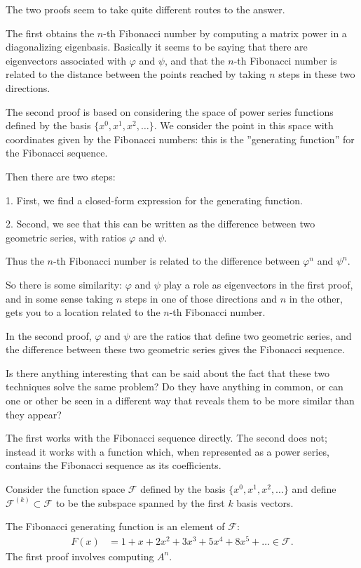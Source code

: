The two proofs seem to take quite different routes to the answer.

The first obtains the $n$-th Fibonacci number by computing a matrix power in a diagonalizing
eigenbasis. Basically it seems to be saying that there are eigenvectors associated with $\varphi$
and $\psi$, and that the $n$-th Fibonacci number is related to the distance between the points reached
by taking $n$ steps in these two directions.

The second proof is based on considering the space of power series functions defined by the
basis $\{x^0, x^1, x^2, \ldots\}$. We consider the point in this space with coordinates given by the
Fibonacci numbers: this is the ''generating function​'' for the Fibonacci sequence.

Then there are two steps:

1. First, we find a closed-form expression for the generating function.

2. Second, we see that this can be written as the difference between two geometric series, with ratios $\varphi$ and $\psi$.

Thus the $n$-th Fibonacci number is related to the difference between $\varphi^n$ and $\psi^n$.

So there is some similarity: $\varphi$ and $\psi$ play a role as eigenvectors in the first proof, and in
some sense taking $n$ steps in one of those directions and $n$ in the other, gets you to a location
related to the $n$-th Fibonacci number.

In the second proof, $\varphi$ and $\psi$ are the ratios that define two geometric series, and the
difference between these two geometric series gives the Fibonacci sequence.

Is there anything interesting that can be said about the fact that these two techniques solve the
same problem? Do they have anything in common, or can one or other be seen in a different way that
reveals them to be more similar than they appear?

The first works with the Fibonacci sequence directly. The second does not; instead it works with a
function which, when represented as a power series, contains the Fibonacci sequence as its
coefficients.

Consider the function space $\mathcal F$ defined by the basis $\{x^0, x^1, x^2, \ldots\}$ and
define $\mathcal F^{(k)} \subset \mathcal F$ to be the subspace spanned by the first $k$ basis
vectors.

The Fibonacci generating function is an element of $\mathcal F$:
\begin{align*}
    F(x) &= 1 + x + 2x^2 + 3x^3 + 5x^4 + 8x^5 + \ldots \in \mathcal F.
  \end{align*}
The first proof involves computing $A^n$.

